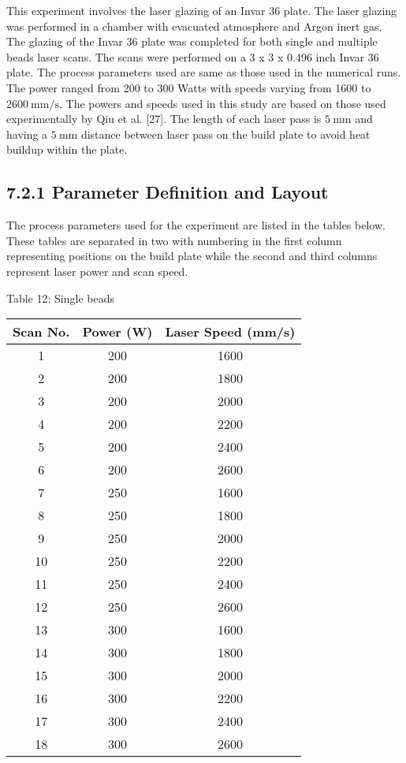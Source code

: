 \documentclass[10pt]{article}
\begin{document}
This experiment involves the laser glazing of an Invar 36 plate. The laser glazing was performed in a chamber with evacuated atmosphere and Argon inert gas. The glazing of the Invar 36 plate was completed for both single and multiple beads laser scans. The scans were performed on a 3 x 3 x 0.496 inch Invar 36 plate. The process parameters used are same as those used in the numerical runs. The power ranged from 200 to 300 Watts with speeds varying from 1600 to $2600 \mathrm{~mm} / \mathrm{s}$. The powers and speeds used in this study are based on those used experimentally by Qiu et al. [27]. The length of each laser pass is $5 \mathrm{~mm}$ and having a $5 \mathrm{~mm}$ distance between laser pass on the build plate to avoid heat buildup within the plate.

\subsection*{7.2.1 Parameter Definition and Layout}
The process parameters used for the experiment are listed in the tables below. These tables are separated in two with numbering in the first column representing positions on the build plate while the second and third columns represent laser power and scan speed.

Table 12: Single beads

\begin{center}
\begin{tabular}{|c|c|c|}
\hline
Scan No. & Power (W) & Laser Speed (mm/s) \\
\hline
1 & 200 & 1600 \\
\hline
2 & 200 & 1800 \\
\hline
3 & 200 & 2000 \\
\hline
4 & 200 & 2200 \\
\hline
5 & 200 & 2400 \\
\hline
6 & 200 & 2600 \\
\hline
7 & 250 & 1600 \\
\hline
8 & 250 & 1800 \\
\hline
9 & 250 & 2000 \\
\hline
10 & 250 & 2200 \\
\hline
11 & 250 & 2400 \\
\hline
12 & 250 & 2600 \\
\hline
13 & 300 & 1600 \\
\hline
14 & 300 & 1800 \\
\hline
15 & 300 & 2000 \\
\hline
16 & 300 & 2200 \\
\hline
17 & 300 & 2400 \\
\hline
18 & 300 & 2600 \\
\hline
\end{tabular}
\end{center}
\end{document}
